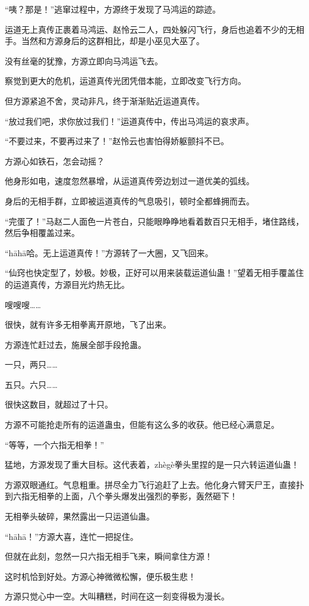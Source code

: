 \begin{this_body}
“咦？那是！”逃窜过程中，方源终于发现了马鸿运的踪迹。

运道无上真传正裹着马鸿运、赵怜云二人，四处躲闪飞行，身后也追着不少的无相手。当然和方源身后的这群相比，却是小巫见大巫了。

没有丝毫的犹豫，方源立即向马鸿运飞去。

察觉到更大的危机，运道真传光团凭借本能，立即改变飞行方向。

但方源紧追不舍，灵动非凡，终于渐渐贴近运道真传。

“放过我们吧，求你放过我们！”运道真传中，传出马鸿运的哀求声。

“不要过来，不要再过来了！”赵怜云也害怕得娇躯颤抖不已。

方源心如铁石，怎会动摇？

他身形如电，速度忽然暴增，从运道真传旁边划过一道优美的弧线。

身后的无相手群，立即被运道真传的气息吸引，顿时全都蜂拥而去。

“完蛋了！”马赵二人面色一片苍白，只能眼睁睁地看着数百只无相手，堵住路线，然后争相覆盖过来。

“hāhā哈。无上运道真传！”方源转了一大圈，又飞回来。

“仙窍也快定型了，妙极。妙极，正好可以用来装载运道仙蛊！”望着无相手覆盖住的运道真传，方源目光灼热无比。

嗖嗖嗖……

很快，就有许多无相拳离开原地，飞了出来。

方源连忙赶过去，施展全部手段抢蛊。

一只，两只……

五只。六只……

很快这数目，就超过了十只。

方源不可能抢走所有的运道蛊虫，但能有这么多的收获。他已经心满意足。

“等等，一个六指无相拳！”

猛地，方源发现了重大目标。这代表着，zhègè拳头里捏的是一只六转运道仙蛊！

方源双眼通红。气息粗重。拼尽全力飞行追赶了上去。他化身六臂天尸王，直接扑到六指无相拳的上面，八个拳头爆发出强烈的拳影，轰然砸下！

无相拳头破碎，果然露出一只运道仙蛊。

“hāhā！”方源大喜，连忙一把捉住。

但就在此刻，忽然一只六指无相手飞来，瞬间拿住方源！

这时机恰到好处。方源心神微微松懈，便乐极生悲！

方源只觉心中一空。大叫糟糕，时间在这一刻变得极为漫长。


\end{this_body}
